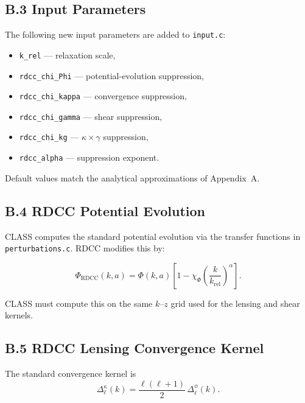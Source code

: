 \documentclass[11pt,a4paper]{article}
\begin{document}
\subsection*{B.3 Input Parameters}

The following new input parameters are added to \texttt{input.c}:

\begin{itemize}
    \item \texttt{k\_rel} — relaxation scale,
    \item \texttt{rdcc\_chi\_Phi} — potential-evolution suppression,
    \item \texttt{rdcc\_chi\_kappa} — convergence suppression,
    \item \texttt{rdcc\_chi\_gamma} — shear suppression,
    \item \texttt{rdcc\_chi\_kg} — $\kappa \times \gamma$ suppression,
    \item \texttt{rdcc\_alpha} — suppression exponent.
\end{itemize}

Default values match the analytical approximations of Appendix~A.

\subsection*{B.4 RDCC Potential Evolution}

CLASS computes the standard potential evolution via the transfer functions in 
\texttt{perturbations.c}. RDCC modifies this by:

\begin{equation}
    \Phi_{\mathrm{RDCC}}(k,a)
    = \Phi(k,a)
      \left[
        1 - \chi_{\Phi}
        \left(\frac{k}{k_{\mathrm{rel}}}\right)^{\alpha}
      \right].
\end{equation}

CLASS must compute this on the same $k$--$z$ grid used for the lensing and shear kernels.

\subsection*{B.5 RDCC Lensing Convergence Kernel}

The standard convergence kernel is
\begin{equation}
    \Delta_{\ell}^{\kappa}(k)
    = \frac{\ell(\ell+1)}{2}\,
      \Delta_{\ell}^{\phi}(k).
\end{equation}
\end{document}
